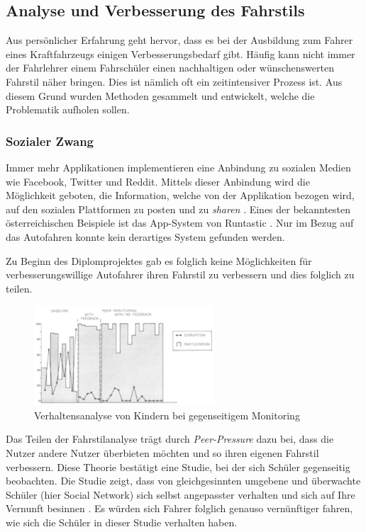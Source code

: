 \subsection{Analyse und Verbesserung des Fahrstils}

Aus persönlicher Erfahrung geht hervor, dass es bei der Ausbildung zum Fahrer eines Kraftfahrzeugs einigen Verbesserungsbedarf gibt. Häufig kann nicht immer der Fahrlehrer einem Fahrschüler einen nachhaltigen oder wünschenswerten Fahrstil näher bringen. Dies ist nämlich oft ein zeitintensiver Prozess ist. Aus diesem Grund wurden Methoden gesammelt und entwickelt, welche die Problematik aufholen sollen.

\subsubsection{Sozialer Zwang}
Immer mehr Applikationen implementieren eine Anbindung zu sozialen Medien wie Facebook, Twitter und Reddit. Mittels dieser Anbindung wird die Möglichkeit geboten, die Information, welche von der Applikation bezogen wird, auf den sozialen Plattformen zu posten und zu \textit{sharen} \cite{SIMR.CH1-fahrstil-analyse.GewohnheitenLoslassen}. Eines der bekanntesten österreichischen Beispiele ist das App-System von Runtastic \cite{SIMR.CH1-Fahrstil-Analyse.BusinessplanRuntastic}.
Nur im Bezug auf das Autofahren konnte kein derartiges System  gefunden werden.

Zu Beginn des Diplomprojektes gab es folglich keine Möglichkeiten für verbesserungswillige Autofahrer ihren Fahrstil zu verbessern und dies folglich zu teilen. 

\begin{figure}\centering
    \includegraphics[width=0.6\textwidth]{images/peerPressure}
    \caption{Verhaltensanalyse von Kindern bei gegenseitigem Monitoring \cite{SIMR.CH1-fahrstil-analyse.PeerPressure}} \label{Fig:imgPeerPressure}
\end{figure}
Das Teilen der Fahrstilanalyse trägt durch \textit{Peer-Pressure}  dazu bei, dass die Nutzer andere Nutzer überbieten möchten und so ihren eigenen Fahrstil verbessern. Diese Theorie bestätigt eine Studie, bei der sich Schüler gegenseitig beobachten. Die Studie zeigt, dass von gleichgesinnten umgebene und überwachte Schüler (hier Social Network) sich selbst angepasster verhalten und sich auf Ihre Vernunft besinnen \cite{SIMR.CH1-fahrstil-analyse.PeerPressure}. Es würden sich Fahrer folglich genauso vernünftiger fahren, wie sich die Schüler in dieser Studie verhalten haben.

